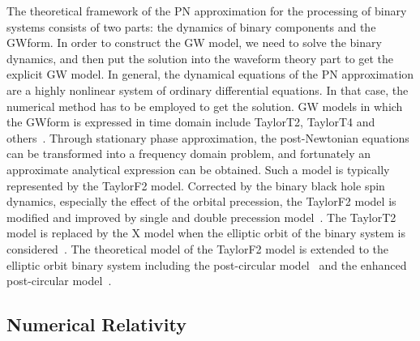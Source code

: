 \documentclass[a4paper,11pt]{article}
\begin{document}
The theoretical framework of the PN approximation for the processing of binary systems consists of two parts: the dynamics of binary components and the GWform. In order to construct the GW model, we need to solve the binary dynamics, and then put the solution into the waveform theory part to get the explicit GW model. In general, the dynamical equations of the PN approximation are a highly nonlinear system of ordinary differential equations. In that case, the numerical method has to be employed to get the solution. GW models in which the GWform is expressed in time domain include TaylorT2, TaylorT4 and others~\cite{Buonanno:2009zt}. Through stationary phase approximation, the post-Newtonian equations can be transformed into a frequency domain problem, and fortunately an approximate analytical expression can be obtained. Such a model is typically represented by the TaylorF2 model. Corrected by the binary black hole spin dynamics, especially the effect of the orbital precession, the TaylorF2 model is modified and improved by single and double precession model~\cite{Lundgren:2013jla,Chatziioannou:2014bma}. The TaylorT2 model is replaced by the X model when  the elliptic orbit of the binary system is considered~\cite{Hinder:2008kv}. The theoretical model of the TaylorF2 model is extended to the elliptic orbit binary system including the post-circular model~\cite{Yunes:2009yz} and the enhanced post-circular model~\cite{Huerta:2014eca,Sun:2015bva}.

\subsection{Numerical Relativity}
\label{subsec:numrical}
\end{document}
